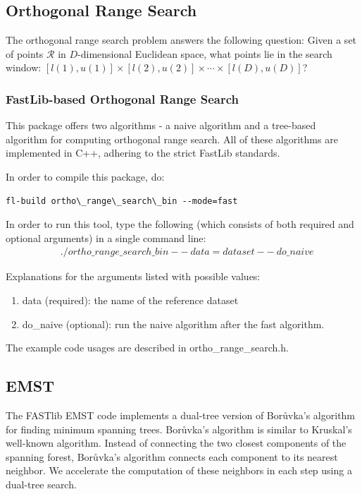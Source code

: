 \documentclass[letter]{report}
\begin{document}
\subsection{Orthogonal Range Search}
The orthogonal range search problem answers the following question:
Given a set of points $\mathcal{R}$ in $D$-dimensional Euclidean
space, what points lie in the search window: $[l(1), u(1)]\times
[l(2),u(2)]\times \cdots \times [l(D),u(D)]$?

\subsubsection{FastLib-based Orthogonal Range Search}
This package offers two algorithms - a naive algorithm and a
tree-based algorithm for computing orthogonal range search. All of
these algorithms are implemented in C++, adhering to the strict
FastLib standards.

In order to compile this package, do: 
\begin{verbatim}
fl-build ortho\_range\_search\_bin --mode=fast
\end{verbatim}
In order to run this tool, type the following (which consists of
both required and optional arguments) in a single command line:
\begin{align*}
& \mathit{./ortho\_range\_search\_bin} \ \mathit{--data=dataset} \
\mathit{--do\_naive}
\end{align*}

Explanations for the arguments listed with possible values:

\begin{enumerate}
\item{data (required): the name of the reference dataset}
\item{do\_naive (optional): run the naive algorithm after the fast
algorithm.}
\end{enumerate}
The example code usages are described in ortho\_range\_search.h.

\subsection{EMST}
The FASTlib EMST code implements a dual-tree version of Bor\r{u}vka's algorithm for finding minimum spanning trees.  Bor\r{u}vka's algorithm is similar to Kruskal's well-known algorithm.  Instead of connecting the two closest components of the spanning forest, Bor\r{u}vka's algorithm connects each component to its nearest neighbor.  We accelerate the computation of these neighbors in each step using a dual-tree search.  
\end{document}
